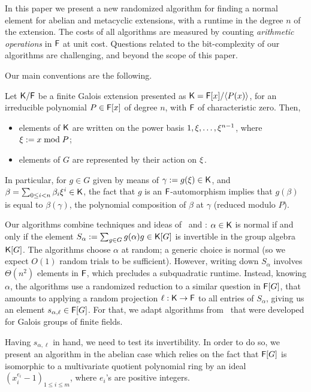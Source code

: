 In this paper we present a new randomized algorithm for finding a normal
element for abelian and metacyclic extensions, with a runtime \alg
in the degree $n$ of the extension. The costs of all algorithms are
measured by counting \emph{arithmetic operations} in ${\mathsf{F}}$ at unit cost.
Questions related to the bit-complexity of our algorithms are challenging,
and beyond the scope of this paper.

Our main conventions are the following.
\begin{assumption}
  \label{assum}
  Let ${\mathsf{K}}/{\mathsf{F}}$ be a finite Galois extension presented as
  ${\mathsf{K}}={\mathsf{F}}[x]/\langle P(x)\rangle$, for an irreducible polynomial $P\in
  {\mathsf{F}}[x]$ of degree $n$, with ${\mathsf{F}}$ of characteristic zero. Then,
  \begin{itemize}
  \item elements of ${\mathsf{K}}$ are written on the power basis $1,\xi,\dots,\xi^{n-1}$,
    where $\xi := x \bmod P$;
  \item elements of $G$ are represented by their action on $\xi$.
  \end{itemize}
\end{assumption}

In particular, for $g \in G$ given by means of $\gamma:=g(\xi) \in {\mathsf{K}}$,
and $\beta = \sum_{0\leq i<n}\beta_i\xi^i\in{\mathsf{K}}$, the fact that $g$ is an
${\mathsf{F}}$-automorphism implies that $g(\beta)$ is equal to $\beta(\gamma)$, the
polynomial composition of $\beta$ at $\gamma$ (reduced modulo $P$).

Our algorithms combine techniques and ideas
of~\cite{GatGie90} and \cite{KalSho98}: $\alpha \in {\mathsf{K}}$ is normal if and only if
the element $S_\alpha := \sum_{g \in G} g(\alpha)g \in {\mathsf{K}}[G]$ is
invertible in the group algebra ${\mathsf{K}}[G]$. The algorithms choose
$\alpha$ at random; a generic choice is normal (so we expect $O(1)$
random trials to be sufficient). However, writing down $S_\alpha$
involves $\Theta(n^2)$ elements in ${\mathsf{F}}$, which precludes a
subquadratic runtime. Instead, knowing $\alpha$, the algorithms use a
randomized reduction to a similar question in ${\mathsf{F}}[G]$, that amounts to
applying a random projection $\ell:{\mathsf{K}}\to{\mathsf{F}}$ to all entries of
$S_\alpha$, giving us an element $s_{\alpha,\ell} \in {\mathsf{F}}[G]$. For
that, we adapt algorithms from~\citep{KalSho98} that were developed for
Galois groups of finite fields.

Having $s_{\alpha,\ell}$ in hand, we need to test its
invertibility. In order to do so, we present an algorithm in the
abelian case which relies on the fact that ${\mathsf{F}}[G]$ is isomorphic to a
multivariate quotient polynomial ring by an ideal $(x^{e_i}_i-1)_{1
  \leq i \leq m}$, where $e_i$'s are positive integers. 

